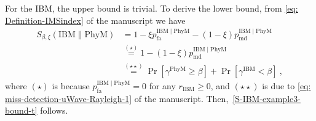 \documentclass[12pt, draftclsnofoot, onecolumn]{IEEEtran}
\begin{document}
\begin{IEEEproof}
For the IBM, the upper bound is trivial. To derive the lower bound, from \eqref{eq: Definition-IMSindex} of the manuscript we have
\begin{align}\label{eq: misdetection-example3-bound-1}
S_{\beta,\xi}\left(\mathrm{IBM}\|\mathrm{PhyM} \right) &  = 1 - \xi p_{\mathrm{fa}}^{{\mathrm{IBM}} \mid {\mathrm{PhyM}}} - \left( 1 - \xi\right) p_{\mathrm{md}}^{{\mathrm{IBM}} \mid {\mathrm{PhyM}}} \nonumber \\
& \stackrel{(\star)}{=} 1 - \left( 1 - \xi\right) p_{\mathrm{md}}^{{\mathrm{IBM}} \mid {\mathrm{PhyM}}} \nonumber\\
& \stackrel{(\star\star)}{=} \Pr \left[\gamma^{\mathrm{PhyM}}  \geq \beta \right] + \Pr \left[\gamma^{\mathrm{IBM}}  < \beta \right]\:,
\end{align}
where $(\star)$ is because $p_{\mathrm{fa}}^{{\mathrm{IBM}} \mid {\mathrm{PhyM}}} = 0$ for any $r_{\mathrm{IBM}} \geq 0$, and $(\star\star)$ is due to \eqref{eq: miss-detection-uWave-Rayleigh-1} of the manuscript. Then,~\eqref{S-IBM-example3-bound-t} follows.


\end{IEEEproof}
\end{document}
